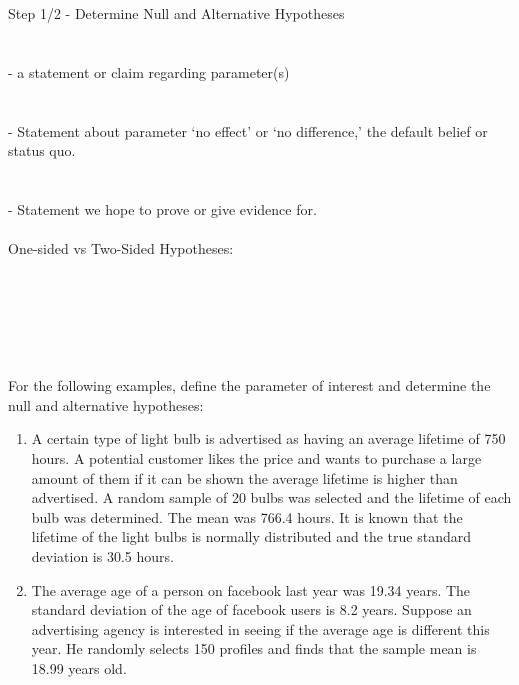 \large Step 1/2 - Determine Null and Alternative Hypotheses\normalsize\\~\\~\\

\underbar{~~~~~~~~~~~~~~~~~~~~~~~~~~~~~~~~~~} - a statement or claim regarding parameter(s)\\~\\~\\
\underbar{~~~~~~~~~~~~~~~~~~~~~~~~~~~~~~~~~~~~~~~~~~~~~~~~~~~~~~~~~~~~~~~~~~~~~~~~~~~~} - Statement about parameter `no effect' or `no difference,' the default belief or status quo.\\~\\~\\
\underbar{~~~~~~~~~~~~~~~~~~~~~~~~~~~~~~~~~~~~~~~~~~~~~~~~~~~~~~~~~~~~~~~~~~~~~~~~~~~~} - Statement we hope to prove or give evidence for.\\~\\

One-sided vs Two-Sided Hypotheses:\\~\\~\\~\\~\\~\\~\\

For the following examples, define the parameter of interest and determine the null and alternative hypotheses:
\begin{enumerate}
\item A certain type of light bulb is advertised as having an average lifetime of 750 hours. A potential customer likes the price and wants to purchase a large amount of them if it can be shown the average lifetime is higher than advertised. A random sample of 20 bulbs was selected and the lifetime of each bulb was determined. The mean was 766.4 hours.  It is known that the lifetime of the light bulbs is normally distributed and the true standard deviation is 30.5 hours.

\newpage

\item The average age of a person on facebook last year was 19.34 years.  The standard deviation of the age of facebook users is 8.2 years.  Suppose an advertising agency is interested in seeing if the average age is different this year. He randomly selects 150 profiles and finds that the sample mean is 18.99 years old.\\~\\~\\~\\~\\~\\
\end{enumerate}

